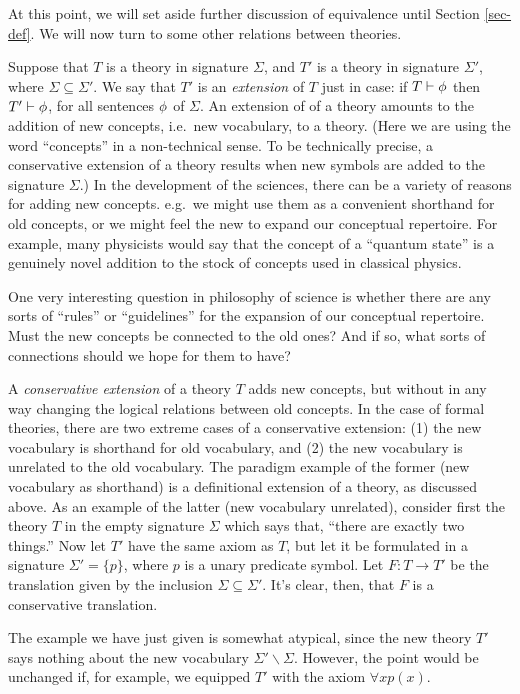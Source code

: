 At this point, we will set aside further discussion of equivalence
until Section \ref{sec-def}.  We will now turn to some other relations
between theories.

Suppose that $T$ is a theory in signature $\Sigma$, and $T'$ is a
theory in signature $\Sigma '$, where $\Sigma \subseteq \Sigma '$.  We
say that $T'$ is an \emph{extension} of $T$ just in case: if
$T\vdash\phi$ then $T'\vdash\phi$, for all sentences $\phi$ of $\Sigma$.
An extension of of a theory amounts to the addition of new concepts,
i.e.\ new vocabulary, to a theory.  (Here we are using the word
``concepts'' in a non-technical sense.  To be technically precise, a
conservative extension of a theory results when new symbols are added
to the signature $\Sigma$.)  In the development of the sciences, there
can be a variety of reasons for adding new concepts.  e.g.\ we might
use them as a convenient shorthand for old concepts, or we might feel
the new to expand our conceptual repertoire.  For example, many
physicists would say that the concept of a ``quantum state'' is a
genuinely novel addition to the stock of concepts used in classical
physics.

One very interesting question in philosophy of science is whether
there are any sorts of ``rules'' or ``guidelines'' for the expansion
of our conceptual repertoire.  Must the new concepts be connected to
the old ones?  And if so, what sorts of connections should we hope for
them to have?

A \emph{conservative extension} of a theory $T$ adds new concepts, but
without in any way changing the logical relations between old
concepts.  In the case of formal theories, there are two extreme cases
of a conservative extension: (1) the new vocabulary is shorthand for
old vocabulary, and (2) the new vocabulary is unrelated to the old
vocabulary.  The paradigm example of the former (new vocabulary as
shorthand) is a definitional extension of a theory, as discussed
above.  As an example of the latter (new vocabulary unrelated),
consider first the theory $T$ in the empty signature $\Sigma$ which
says that, ``there are exactly two things.''  Now let $T'$ have the
same axiom as $T$, but let it be formulated in a signature
$\Sigma '=\{ p\}$, where $p$ is a unary predicate symbol.  Let
$F:T\to T'$ be the translation given by the inclusion
$\Sigma \subseteq \Sigma '$.  It's clear, then, that $F$ is a
conservative translation.

  The example we have just given is somewhat atypical, since the new
  theory $T'$ says nothing about the new vocabulary
  $\Sigma '\backslash \Sigma$.  However, the point would be unchanged
  if, for example, we equipped $T'$ with the axiom $\forall xp(x)$.


